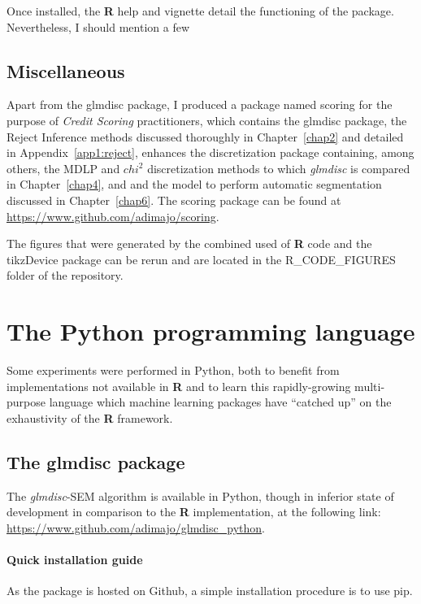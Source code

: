 Once installed, the \textbf{R} help and vignette detail the functioning of the package. Nevertheless, I should mention a few 


\subsection{Miscellaneous}

Apart from the glmdisc package, I produced a package named scoring for the purpose of \textit{Credit Scoring} practitioners, which contains the glmdisc package, the Reject Inference methods discussed thoroughly in Chapter~\ref{chap2} and detailed in Appendix~\ref{app1:reject}, enhances the discretization package containing, among others, the MDLP and $chi^2$ discretization methods to which \textit{glmdisc} is compared in Chapter~\ref{chap4}, and and the model to perform automatic segmentation discussed in Chapter~\ref{chap6}. The scoring package can be found at \url{https://www.github.com/adimajo/scoring}.

The figures that were generated by the combined used of \textbf{R} code and the tikzDevice package can be rerun and are located in the R\_CODE\_FIGURES folder of the repository.

\section{The Python programming language}

Some experiments were performed in Python, both to benefit from implementations not available in \textbf{R} and to learn this rapidly-growing multi-purpose language which machine learning packages have ``catched up'' on the exhaustivity of the \textbf{R} framework.

\subsection{The glmdisc package}

The \textit{glmdisc}-SEM algorithm is available in Python, though in inferior state of development in comparison to the \textbf{R} implementation, at the following link: \url{https://www.github.com/adimajo/glmdisc_python}.

\paragraph{Quick installation guide}

As the package is hosted on Github, a simple installation procedure is to use pip.

